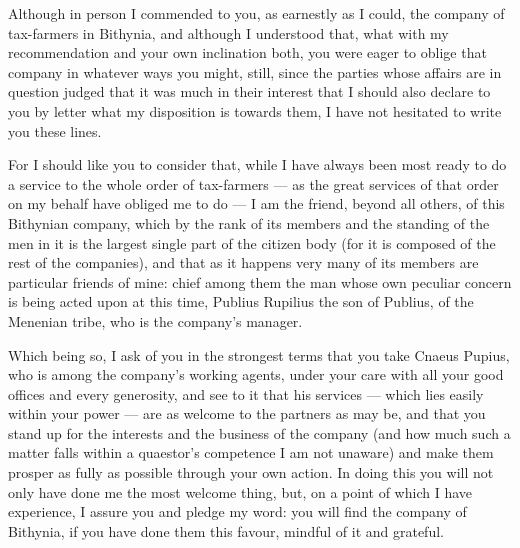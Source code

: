

 Although in person I commended to you, as earnestly as I could, the company of tax-farmers in Bithynia, and although I understood that, what with my recommendation and your own inclination both, you were eager to oblige that company in whatever ways you might, still, since the parties whose affairs are in question judged that it was much in their interest that I should also declare to you by letter what my disposition is towards them, I have not hesitated to write you these lines.

 For I should like you to consider that, while I have always been most ready to do a service to the whole order of tax-farmers --- as the great services of that order on my behalf have obliged me to do --- I am the friend, beyond all others, of this Bithynian company, which by the rank of its members and the standing of the men in it is the largest single part of the citizen body (for it is composed of the rest of the companies), and that as it happens very many of its members are particular friends of mine: chief among them the man whose own peculiar concern is being acted upon at this time, Publius Rupilius the son of Publius, of the Menenian tribe, who is the company's manager.

 Which being so, I ask of you in the strongest terms that you take Cnaeus Pupius, who is among the company's working agents, under your care with all your good offices and every generosity, and see to it that his services --- which lies easily within your power --- are as welcome to the partners as may be, and that you stand up for the interests and the business of the company (and how much such a matter falls within a quaestor's competence I am not unaware) and make them prosper as fully as possible through your own action. In doing this you will not only have done me the most welcome thing, but, on a point of which I have experience, I assure you and pledge my word: you will find the company of Bithynia, if you have done them this favour, mindful of it and grateful.
